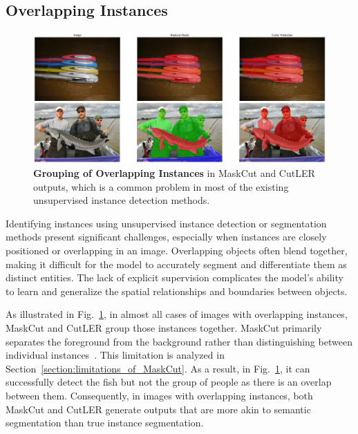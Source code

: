 \subsection{Overlapping Instances}
\label{section:overlapping_instances_analysis}
\begin{figure}
	\centering
	\includegraphics[width=1\textwidth]{Images/main/cutler-prob-overlap.png}
	\caption[\textbf{Cutler's Performance on Images with Overlapping Instances}]{\textbf{Grouping of Overlapping Instances} in MaskCut and CutLER outputs, which is a common problem in most of the existing unsupervised instance detection methods.}
	\label{fig:cutler_overlapping_instances_eg}
\end{figure}

Identifying instances using unsupervised instance detection or segmentation methods present significant challenges, especially when instances are closely positioned or overlapping in an image. Overlapping objects often blend together, making it difficult for the model to accurately segment and differentiate them as distinct entities. The lack of explicit supervision complicates the model's ability to learn and generalize the spatial relationships and boundaries between objects.

As illustrated in Fig.~\ref{fig:cutler_overlapping_instances_eg}, in almost all cases of images with overlapping instances, MaskCut and CutLER group those instances together. MaskCut primarily separates the foreground from the background rather than distinguishing between individual instances~\cite{engstler2023understanding}. This limitation is analyzed in Section~\ref{section:limitations_of_MaskCut}. As a result, in Fig.~\ref{fig:cutler_overlapping_instances_eg}, it can successfully detect the fish but not the group of people as there is an overlap between them. Consequently, in images with overlapping instances, both MaskCut and CutLER generate outputs that are more akin to semantic segmentation than true instance segmentation.

